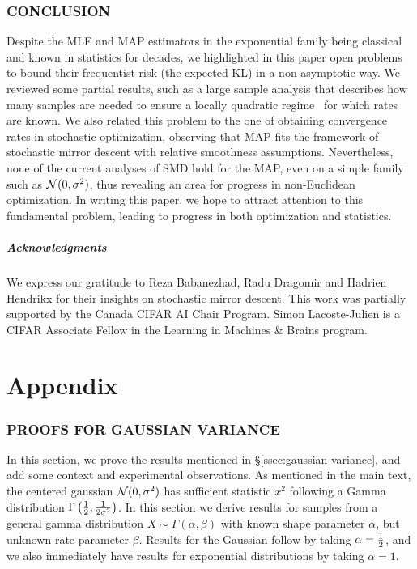 \documentclass[twoside]{article}
\begin{document}
\section{CONCLUSION}
Despite the MLE and MAP estimators in the exponential family being classical and known in statistics for decades, we highlighted in this paper open problems to bound their frequentist risk (the expected KL) in a non-asymptotic way. We reviewed some partial results, such as a large sample analysis that describes how many samples are needed to ensure a locally quadratic regime~\citep{kakade2010learning, ostrovskii2021finite} for which rates are known. We also related this problem to the one of obtaining convergence rates in stochastic optimization, observing that MAP fits the framework of stochastic mirror descent with relative smoothness assumptions.
Nevertheless, none of the current analyses of SMD hold for the MAP, even on a simple family such as ${\mathcal N}(0,\sigma^2)$, thus revealing an area for progress in non-Euclidean optimization.
In writing this paper, we hope to attract attention to this fundamental problem, leading to progress in both optimization and statistics.

\subsubsection*{Acknowledgments}
We express our gratitude to Reza Babanezhad, Radu Dragomir and Hadrien Hendrikx for their insights on stochastic mirror descent. 
This work was partially supported by the Canada CIFAR AI Chair Program. 
Simon Lacoste-Julien is a CIFAR Associate Fellow in the Learning in Machines \& Brains program.






\clearpage
\appendix
\onecolumn


\part{Appendix} %
\parttoc %

\section{PROOFS FOR GAUSSIAN VARIANCE}
\label{app:gaussian-variance}


In this section, we prove the results mentioned in \S\ref{ssec:gaussian-variance},
and add some context and experimental observations.
As mentioned in the main text, the centered gaussian ${\mathcal N}(0,\sigma^2)$ has sufficient statistic $x^2$ following a Gamma distribution $\Gamma\left(\frac{1}{2}, \frac{1}{2 \sigma^2}\right)$. 
In this section we derive results for samples  from a general gamma distribution $X \sim\Gamma(\alpha,\beta)$ with known shape parameter $\alpha$, but unknown rate parameter $\beta$.
Results for the Gaussian follow by taking $\alpha=\frac{1}{2}$,
 and we also immediately have results for exponential distributions by taking $\alpha=1$.
\end{document}

